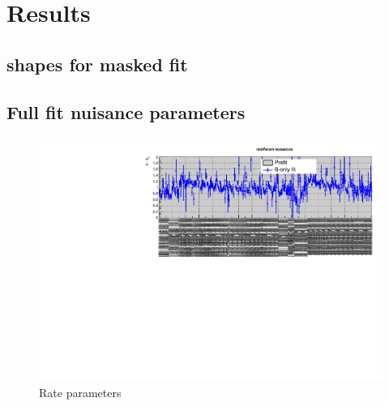 \section{Results}
\label{app:results}

\subsection{\texorpdfstring{\mht}{MHT} shapes for masked fit }
\label{app:mhtshapes}



%
%

\clearpage
\subsection{Full fit nuisance parameters}
\label{app:nuispost}

\begin{figure}[h!]
  \centering
  \caption{Rate parameters}
  \includegraphics[width=1.\linewidth]{figures/results/36invfb/postfit/nuis/Rates_nuisances}
\end{figure}

